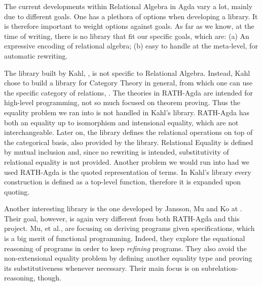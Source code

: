 The current developments within Relational Algebra in Agda vary a lot, mainly due to
different goals. One has a plethora of options when developing a library. It is therefore
important to weight options against goals. As far as we know, at the time
of writing, there is no library that fit our specific goals, which
are: (a) An expressive encoding of relational algebra; (b) easy to handle at the meta-level,
for automatic rewriting.

The library built by Kahl, \cite{RATHAgda}, is not specific to Relational Algebra.
Instead, Kahl chose to build a library for Category Theory in general, from which one can use
the specific category of relations, . The theories in RATH-Agda are intended
for high-level programming, not so much focused on theorem proving. Thus
the equality problem we ran into is not handled in Kahl's library. RATH-Agda has both an equality up to
isomorphism and intensional equality, which are not interchangeable. Later on, the library
defines the relational operations on top of the categorical basis, also provided by the library.
Relational Equality is defined by mutual inclusion and, since no rewriting is intended,
substitutivity of relational equality is not provided. Another problem we would run into
had we used RATH-Agda is the quoted representation of terms. In Kahl's library every
construction is defined as a top-level function, therefore it is expanded upon quoting. 

Another interesting library is the one developed by Jansson, Mu and Ko at \cite{Jansson09}. 
Their goal, however, is again very different from both RATH-Agda and this project.
Mu, et al., are focusing on deriving programs given specifications, which is a big merit of
functional programming. Indeed, they explore the equational reasoning of programs in order to keep
\emph{refining} programs. They also avoid the non-extensional equality problem by defining
another equality type and proving its substitutiveness whenever necessary. Their main focus
is on subrelation-reasoning, though.
